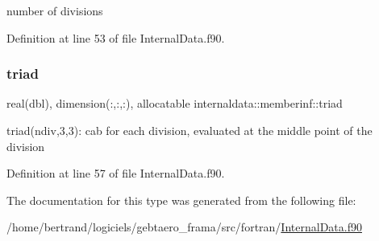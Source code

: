 number of divisions 



Definition at line 53 of file Internal\+Data.\+f90.

\mbox{\label{structinternaldata_1_1memberinf_aedb5a98d6a0011605f5458f065019a01}} 
\subsubsection{\texorpdfstring{triad}{triad}}
{\footnotesize\ttfamily real(dbl), dimension(\+:,\+:,\+:), allocatable internaldata\+::memberinf\+::triad}



triad(ndiv,3,3)\+: cab for each division, evaluated at the middle point of the division 



Definition at line 57 of file Internal\+Data.\+f90.



The documentation for this type was generated from the following file\+:\begin{DoxyCompactItemize}
\item 
/home/bertrand/logiciels/gebtaero\+\_\+frama/src/fortran/\hyperlink{_internal_data_8f90}{Internal\+Data.\+f90}\end{DoxyCompactItemize}
